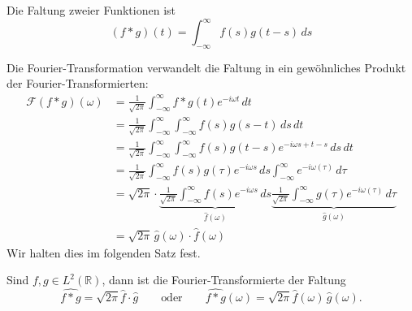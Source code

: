 \begin{definition}
\label{definition:faltung}
Die Faltung zweier Funktionen ist
\begin{equation}
(f*g)(t)
=
\int_{-\infty}^\infty f(s)g(t-s)\,ds
\label{definition:formel:faltung}
\end{equation}
\end{definition}
Die Fourier-Transformation verwandelt die Faltung in ein gewöhnliches
Produkt der Fourier-Transformierten:
\begin{align*}
\mathcal{F}(f*g)(\omega)
&=
\frac{1}{\sqrt{2\pi}}
\int_{-\infty}^\infty
f*g(t)
e^{-i\omega t}
\,dt
\\
&=
\frac{1}{\sqrt{2\pi}}
\int_{-\infty}^\infty
\int_{-\infty}^\infty
f(s) g(s-t)
\,ds
\,dt
\\
&=
\frac{1}{\sqrt{2\pi}}
\int_{-\infty}^\infty
\int_{-\infty}^\infty
f(s) g(t-s)
e^{-i\omega s+t-s}
\,ds
\,dt
\\
&=
\frac{1}{\sqrt{2\pi}}
\int_{-\infty}^\infty
f(s) g(\tau)
e^{-i\omega s}
\,ds
\int_{-\infty}^\infty
e^{-i\omega (\tau)}
\,d\tau
\\
&=
\sqrt{2\pi}
\cdot
\underbrace{
\frac{1}{\sqrt{2\pi}}
\int_{-\infty}^\infty
f(s)
e^{-i\omega s}
\,ds}_{\displaystyle \hat{f}(\omega)}
\underbrace{
\frac{1}{\sqrt{2\pi}}
\int_{-\infty}^\infty
g(\tau)
e^{-i\omega (\tau)}
\,d\tau}_{\displaystyle \hat{g}(\omega)}
\\
&=
\sqrt{2\pi}\,
\hat{g}(\omega)\cdot \hat{f}(\omega)
\end{align*}
Wir halten dies im folgenden Satz fest.

\begin{satz}[Faltungsformel]
\label{satz:faltungsformel}
Sind $f,g\in L^2(\mathbb R)$, dann ist die Fourier-Transformierte
der Faltung
\begin{equation}
\widehat{f*g}
=
\sqrt{2\pi}
\hat{f}\cdot \hat{g}
\qquad\text{oder}\qquad
\widehat{f*g}(\omega)
=
\sqrt{2\pi}
\hat{f}(\omega)\, \hat{g}(\omega).
\label{ft:faltungsformel}
\end{equation}
\end{satz}




